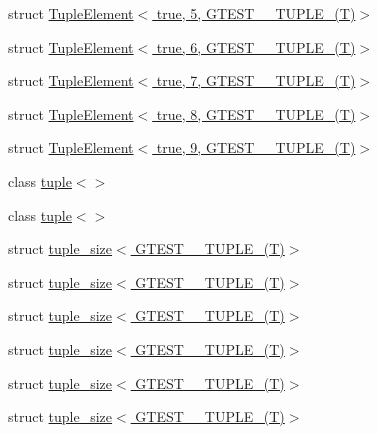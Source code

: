 \begin{DoxyCompactItemize}
struct \hyperlink{structstd_1_1tr1_1_1gtest__internal_1_1TupleElement_3_01true_00_015_00_01GTEST__10__TUPLE___07T_08_4}{\-Tuple\-Element$<$ true, 5, G\-T\-E\-S\-T\-\_\-\_\-\-T\-U\-P\-L\-E\-\_\-(\-T)$>$}
\item 
struct \hyperlink{structstd_1_1tr1_1_1gtest__internal_1_1TupleElement_3_01true_00_016_00_01GTEST__10__TUPLE___07T_08_4}{\-Tuple\-Element$<$ true, 6, G\-T\-E\-S\-T\-\_\-\_\-\-T\-U\-P\-L\-E\-\_\-(\-T)$>$}
\item 
struct \hyperlink{structstd_1_1tr1_1_1gtest__internal_1_1TupleElement_3_01true_00_017_00_01GTEST__10__TUPLE___07T_08_4}{\-Tuple\-Element$<$ true, 7, G\-T\-E\-S\-T\-\_\-\_\-\-T\-U\-P\-L\-E\-\_\-(\-T)$>$}
\item 
struct \hyperlink{structstd_1_1tr1_1_1gtest__internal_1_1TupleElement_3_01true_00_018_00_01GTEST__10__TUPLE___07T_08_4}{\-Tuple\-Element$<$ true, 8, G\-T\-E\-S\-T\-\_\-\_\-\-T\-U\-P\-L\-E\-\_\-(\-T)$>$}
\item 
struct \hyperlink{structstd_1_1tr1_1_1gtest__internal_1_1TupleElement_3_01true_00_019_00_01GTEST__10__TUPLE___07T_08_4}{\-Tuple\-Element$<$ true, 9, G\-T\-E\-S\-T\-\_\-\_\-\-T\-U\-P\-L\-E\-\_\-(\-T)$>$}
\item 
class \hyperlink{classstd_1_1tr1_1_1tuple_3_4}{tuple$<$$>$}
\item 
class \hyperlink{classstd_1_1tr1_1_1tuple}{tuple$<$$>$}
\item 
struct \hyperlink{structstd_1_1tr1_1_1tuple__size_3_01GTEST__0__TUPLE___07T_08_4}{tuple\-\_\-size$<$ G\-T\-E\-S\-T\-\_\-\_\-\-T\-U\-P\-L\-E\-\_\-(\-T)$>$}
\item 
struct \hyperlink{structstd_1_1tr1_1_1tuple__size_3_01GTEST__1__TUPLE___07T_08_4}{tuple\-\_\-size$<$ G\-T\-E\-S\-T\-\_\-\_\-\-T\-U\-P\-L\-E\-\_\-(\-T)$>$}
\item 
struct \hyperlink{structstd_1_1tr1_1_1tuple__size_3_01GTEST__2__TUPLE___07T_08_4}{tuple\-\_\-size$<$ G\-T\-E\-S\-T\-\_\-\_\-\-T\-U\-P\-L\-E\-\_\-(\-T)$>$}
\item 
struct \hyperlink{structstd_1_1tr1_1_1tuple__size_3_01GTEST__3__TUPLE___07T_08_4}{tuple\-\_\-size$<$ G\-T\-E\-S\-T\-\_\-\_\-\-T\-U\-P\-L\-E\-\_\-(\-T)$>$}
\item 
struct \hyperlink{structstd_1_1tr1_1_1tuple__size_3_01GTEST__4__TUPLE___07T_08_4}{tuple\-\_\-size$<$ G\-T\-E\-S\-T\-\_\-\_\-\-T\-U\-P\-L\-E\-\_\-(\-T)$>$}
\item 
struct \hyperlink{structstd_1_1tr1_1_1tuple__size_3_01GTEST__5__TUPLE___07T_08_4}{tuple\-\_\-size$<$ G\-T\-E\-S\-T\-\_\-\_\-\-T\-U\-P\-L\-E\-\_\-(\-T)$>$}

\end{DoxyCompactItemize}
